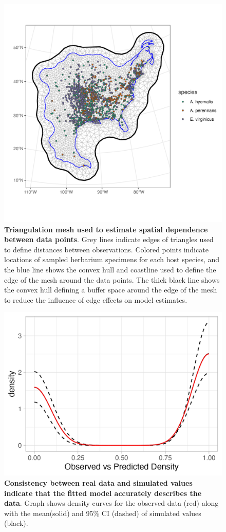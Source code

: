 \documentclass[11pt]{article}
\begin{document}
	\begin{figure}[H]
		\centering
		\includegraphics[width = \linewidth]{../Plots/mesh_plot.png}
		\caption{\textbf{Triangulation mesh used to estimate spatial dependence between data points}. Grey lines indicate edges of triangles used to define distances between observations. Colored points indicate locations of sampled herbarium specimens for each host species, and the blue line shows the convex hull and coastline used to define the edge of the mesh around the data points. The thick black line shows the convex hull defining a buffer space around the edge of the mesh to reduce the influence of edge effects on model estimates.}
		\label{fig:meshplot}
	\end{figure}

\begin{figure}[H]
	\centering
	\includegraphics[width = .8\linewidth]{density_plot.png}
	\caption{\textbf{Consistency between real data and simulated values indicate that the fitted model accurately describes the data}. Graph shows density curves for the observed data (red) along with the mean(solid) and 95\% CI (dashed) of simulated values (black).}
\end{figure}
\end{document}
